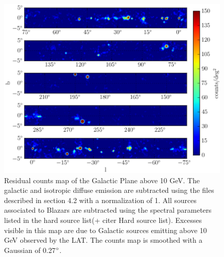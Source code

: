 \begin{figure}[h!]
\centering
\includegraphics[width=\textwidth]{figures/Plan_gal.eps}
\caption{Residual counts map of the Galactic Plane above 10 GeV. The galactic and isotropic diffuse emission are subtracted using the files described in section 4.2 with a normalization of 1. All sources associated to Blazars are subtracted using the spectral parameters listed in the hard source list(+ citer Hard source list). Excesses visible in this map are due to Galactic sources emitting above 10 GeV observed by the LAT. The counts map is smoothed with a Gaussian of 0.27$\mbox{$^\circ$}$.
\label{fig:PlanGal}}
\end{figure}

